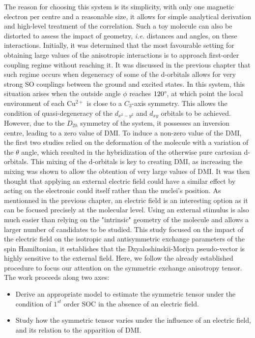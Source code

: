 \documentclass[12pt,a4paper]{report}
\numberwithin{equation}{section}
\begin{document}
The reason for choosing this system is its simplicity, with only one magnetic electron per centre and a reasonable size, it allows for simple analytical derivation and high-level treatment of the correlation.
Such a toy molecule can also be distorted to assess the impact of geometry, \textit{i.e.} distances and angles, on these interactions.
Initially, it was determined that the most favourable setting for obtaining large values of the anisotropic interactions is to approach first-order coupling regime without reaching it.
It was discussed in the previous chapter that such regime occurs when degeneracy of some of the d-orbitals allows for very strong SO couplings between the ground and excited states.
In this system, this situation arises when the outside angle $\phi$ reaches $120 \degree$, at which point the local environment of each Cu$^{2+}$ is close to a $C_3$-axis symmetry.
This allows the condition of quasi-degeneracy of the $d_{x^2-y^2}$ and $d_{xy}$ orbitals to be achieved. However, due to the $D_{2h}$ symmetry of the system, it possesses an inversion centre, leading to a zero value of DMI.
To induce a non-zero value of the DMI, the first two studies relied on the deformation of the molecule with a variation of the $\theta$ angle, which resulted in the hybridization of the otherwise pure cartesian d-orbitals.
This mixing of the d-orbitals is key to creating DMI, as increasing the mixing was shown to allow the obtention of very large values of DMI.
It was then thought that applying an external electric field could have a similar effect by acting on the electronic could itself rather than the nuclei's position.\cite{pradines_impact_2022}
As mentionned in the previous chapter, an electric field is an interesting option as it can be focused precisely at the molecular level. 
Using an external stimulus is also much easier than relying on the "intrinsic" geometry of the molecule and allows a larger number of candidates to be studied.
This study focused on the impact of the electric field on the isotropic and antisymmetric exchange parameters of the spin Hamiltonian, it establishes that the Dzyaloshinskii-Moriya pseudo-vector is highly sensitive to the external field.
Here, we follow the already established procedure to focus our attention on the symmetric exchange anisotropy tensor.
The work proceeds along two axes:
\begin{itemize}
    \item[(i)] Derive an appropriate model to estimate the symmetric tensor under the condition of $1^{st}$ order SOC in the absence of an electric field.
    \item[(ii)] Study how the symmetric tensor varies under the influence of an electric field, and its relation to the apparition of DMI.
\end{itemize}
\end{document}

